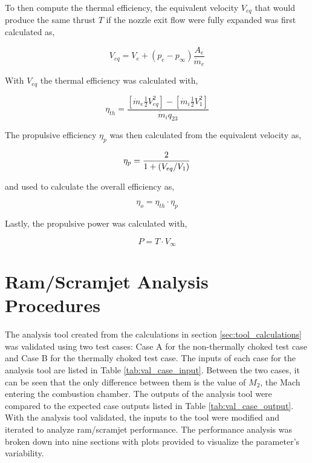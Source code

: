 \documentclass[conf]{new-aiaa} %
\begin{document}
To then compute the thermal efficiency, the equivalent velocity $V_{eq}$ that would produce the same thrust $T$ if the nozzle exit flow were fully expanded was first calculated as,

\begin{equation}
    \label{eqn:Veq}
    V_{eq}=V_e+\left(p_e-p_\infty\right)\frac{A_e}{\dot{m}_e}
\end{equation}

With $V_{eq}$ the thermal efficiency was calculated with,

\begin{equation}
    \label{eqn:etath}
    \eta_{th}=\frac{\left[\dot{m}_e\frac{1}{2}V_{eq}^2\right]-\left[\dot{m}_i\frac{1}{2}V_{1}^2\right]}{\dot{m}_i q_{23}}
\end{equation}

The propulsive efficiency $\eta_{p}$ was then calculated from the equivalent velocity as,

\begin{equation}
    \label{eqn:etap}
    \left. \eta_p=\frac{2}{1+\left(V_{eq}\middle/V_1\right)} \right.
\end{equation}

and used to calculate the overall efficiency as,

\begin{equation}
    \label{eqn:etao}
    \eta_o=\eta_{th}\cdot\eta_p
\end{equation}

Lastly, the propulsive power was calculated with,

\begin{equation}
    \label{eqn:P}
    P=T\cdot V_\infty
\end{equation}


\section{Ram/Scramjet Analysis Procedures} \label{sec:ram_scramjet_analysis_procedures}
The analysis tool created from the calculations in section \ref{sec:tool_calculations} was validated using two test cases: Case A for the non-thermally choked test case and Case B for the thermally choked test case. The inputs of each case for the analysis tool are listed in Table \ref{tab:val_case_input}. Between the two cases, it can be seen that the only difference between them is the value of $M_2$, the Mach entering the combustion chamber. The outputs of the analysis tool were compared to the expected case outputs listed in Table \ref{tab:val_case_output}. With the analysis tool validated, the inputs to the tool were modified and iterated to analyze ram/scramjet performance. The performance analysis was broken down into nine sections with plots provided to visualize the parameter's variability.
\end{document}

